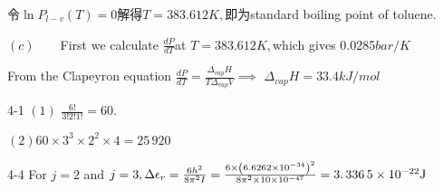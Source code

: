 \documentclass{ctexart}
\begin{document}
令$\ln P_{l-v}\left( T\right) =0$解得\qquad $T=383.612%
\unit{K},$即为standard boiling point of toluene.

$\left( c\right) \qquad $First we calculate $\frac{dP}{dT}$at $T=383.612%
\unit{K},$which gives 0.0285$\unit{bar}/\unit{K}$

From the Clapeyron equation $\frac{dP}{dT}=\frac{\Delta _{vap}H}{T\Delta
_{vap}V}\implies $ $\Delta _{vap}H=33.4\unit{kJ}/\unit{mol}$

4-1 $\left( 1\right) $ $\frac{6!}{3!2!1!}=\allowbreak 60.$

$\left( 2\right) 60\times 3^{3}\times 2^{2}\times 4=\allowbreak 25\,920$

4-4 For $j=2$ and $j=3,\Delta \epsilon _{r}=\frac{6h^{2}}{8\pi ^{2}I}=\frac{%
6\times \left( 6.6262\times 10^{-34}\right) ^{2}}{8\pi ^{2}\times 10\times
10^{-47}}=\allowbreak 3.\,\allowbreak 336\,5\times 10^{-22}\unit{J}$
\end{document}
